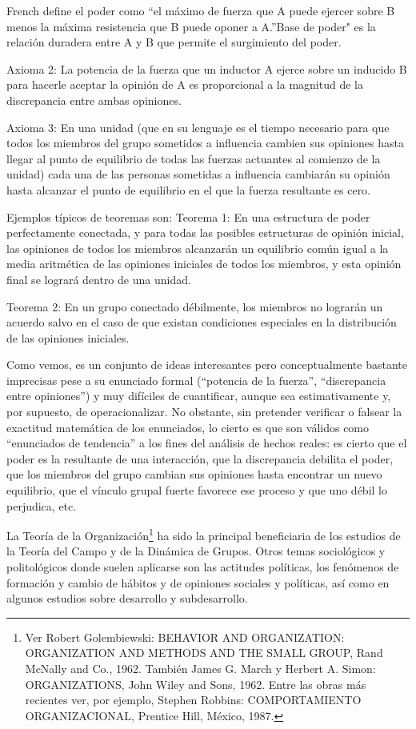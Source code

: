 \documentclass[
]{book}
\begin{document}
French define el poder como ``el máximo de fuerza que A puede ejercer sobre B menos la máxima resistencia que B puede oponer a A.''Base de poder" es la relación duradera entre A y B que permite el surgimiento del poder.

Axioma 2: La potencia de la fuerza que un inductor A ejerce sobre un inducido B para hacerle aceptar la opinión de A es proporcional a la magnitud de la discrepancia entre ambas opiniones.

Axioma 3: En una unidad (que en su lenguaje es el tiempo necesario para que todos los miembros del grupo sometidos a influencia cambien sus opiniones hasta llegar al punto de equilibrio de todas las fuerzas actuantes al comienzo de la unidad) cada una de las personas sometidas a influencia cambiarán su opinión hasta alcanzar el punto de equilibrio en el que la fuerza resultante es cero.

Ejemplos típicos de teoremas son: Teorema 1: En una estructura de poder perfectamente conectada, y para todas las posibles estructuras de opinión inicial, las opiniones de todos los miembros alcanzarán un equilibrio común igual a la media aritmética de las opiniones iniciales de todos los miembros, y esta opinión final se logrará dentro de una unidad.

Teorema 2: En un grupo conectado débilmente, los miembros no lograrán un acuerdo salvo en el caso de que existan condiciones especiales en la distribución de las opiniones iniciales.

Como vemos, es un conjunto de ideas interesantes pero conceptualmente bastante imprecisas pese a su enunciado formal (``potencia de la fuerza'', ``discrepancia entre opiniones'') y muy difíciles de cuantificar, aunque sea estimativamente y, por supuesto, de operacionalizar. No obstante, sin pretender verificar o falsear la exactitud matemática de los enunciados, lo cierto es que son válidos como ``enunciados de tendencia'' a los fines del análisis de hechos reales: es cierto que el poder es la resultante de una interacción, que la discrepancia debilita el poder, que los miembros del grupo cambian sus opiniones hasta encontrar un nuevo equilibrio, que el vínculo grupal fuerte favorece ese proceso y que uno débil lo perjudica, etc.

La Teoría de la Organización\footnote{Ver Robert Golembiewski: BEHAVIOR AND ORGANIZATION: ORGANIZATION AND METHODS AND THE SMALL GROUP, Rand McNally and Co., 1962. También James G. March y Herbert A. Simon: ORGANIZATIONS, John Wiley and Sons, 1962. Entre las obras más recientes ver, por ejemplo, Stephen Robbins: COMPORTAMIENTO ORGANIZACIONAL, Prentice Hill, México, 1987.} ha sido la principal beneficiaria de los estudios de la Teoría del Campo y de la Dinámica de Grupos. Otros temas sociológicos y politológicos donde suelen aplicarse son las actitudes políticas, los fenómenos de formación y cambio de hábitos y de opiniones sociales y políticas, así como en algunos estudios sobre desarrollo y subdesarrollo.
\end{document}
